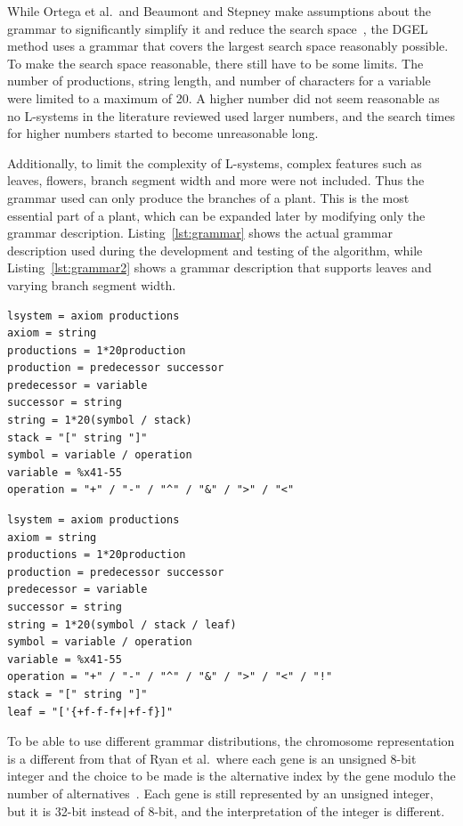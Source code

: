While Ortega et al.\ and Beaumont and Stepney make assumptions about the grammar to significantly simplify it and reduce the search space~\cite{2003Ortega, 2009Beaumont}, the DGEL method uses a grammar that covers the largest search space reasonably possible.
To make the search space reasonable, there still have to be some limits.
The number of productions, string length, and number of characters for a variable were limited to a maximum of 20.
A higher number did not seem reasonable as no L-systems in the literature reviewed used larger numbers, and the search times for higher numbers started to become unreasonable long.

Additionally, to limit the complexity of L-systems, complex features such as leaves, flowers, branch segment width and more were not included.
Thus the grammar used can only produce the branches of a plant.
This is the most essential part of a plant, which can be expanded later by modifying only the grammar description.
Listing~\ref{lst:grammar} shows the actual grammar description used during the development and testing of the algorithm, while Listing~\ref{lst:grammar2} shows a grammar description that supports leaves and varying branch segment width.

\begin{lstlisting}[caption=ABNF grammar description used in DGEL, label=lst:grammar, float]
lsystem = axiom productions
axiom = string
productions = 1*20production
production = predecessor successor
predecessor = variable
successor = string
string = 1*20(symbol / stack)
stack = "[" string "]"
symbol = variable / operation
variable = %x41-55
operation = "+" / "-" / "^" / "&" / ">" / "<"
\end{lstlisting}

\begin{lstlisting}[caption=ABNF grammar description supporting leaves and varying branch segment width, label=lst:grammar2, float]
lsystem = axiom productions
axiom = string
productions = 1*20production
production = predecessor successor
predecessor = variable
successor = string
string = 1*20(symbol / stack / leaf)
symbol = variable / operation
variable = %x41-55
operation = "+" / "-" / "^" / "&" / ">" / "<" / "!"
stack = "[" string "]"
leaf = "['{+f-f-f+|+f-f}]"
\end{lstlisting}

To be able to use different grammar distributions, the chromosome representation is a different from that of Ryan et al.\ where each gene is an unsigned 8-bit integer and the choice to be made is the alternative index by the gene modulo the number of alternatives~\cite{1998Ryan}.
Each gene is still represented by an unsigned integer, but it is 32-bit instead of 8-bit, and the interpretation of the integer is different.

